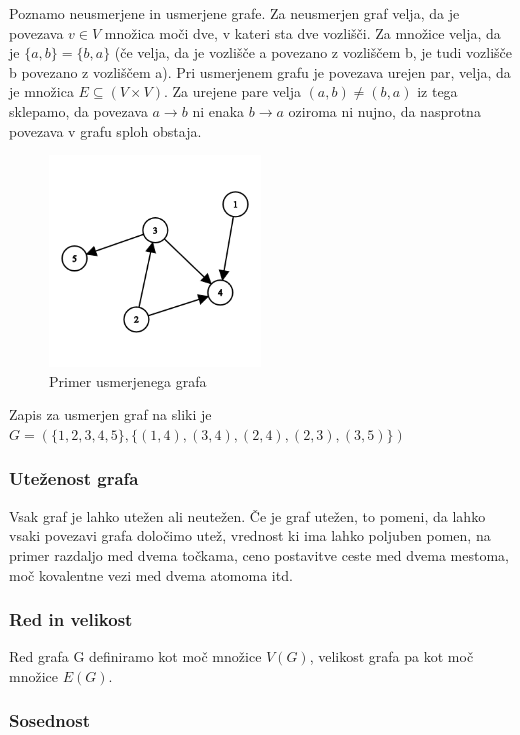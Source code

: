 \documentclass[11pt]{article}
\begin{document}
Poznamo neusmerjene in usmerjene grafe. Za neusmerjen graf velja, da je povezava $v \in V$ množica moči dve, v kateri sta dve vozlišči. Za množice velja, da je $\{a, b\} = \{b, a\}$ (če velja, da je vozlišče a povezano z vozliščem b, je tudi vozlišče b povezano z vozliščem a). Pri usmerjenem grafu je povezava urejen par, velja, da je množica $E \subseteq (V \times V)$. Za urejene pare velja $(a, b) \neq (b, a)$ iz tega sklepamo, da povezava $a \rightarrow b$ ni enaka $b \rightarrow a$ oziroma ni nujno, da nasprotna povezava v grafu sploh obstaja.

\begin{figure}[H]
    \centering
    \includegraphics[width=0.5\textwidth]{directed_graph.png}
    \caption{Primer usmerjenega grafa}
    \label{fig:mesh1}
\end{figure}

Zapis za usmerjen graf na sliki je $G = (\{1, 2, 3, 4, 5\}, \{(1, 4), (3, 4), (2, 4), (2, 3), (3, 5) \})$

\subsubsection{Uteženost grafa}

Vsak graf je lahko utežen ali neutežen. Če je graf utežen, to pomeni, da lahko vsaki povezavi grafa določimo utež, vrednost ki ima lahko poljuben pomen, na primer razdaljo med dvema točkama, ceno postavitve ceste med dvema mestoma, moč kovalentne vezi med dvema atomoma itd. 

\subsubsection{Red in velikost}

Red grafa G definiramo kot moč množice $V(G)$, velikost grafa pa kot moč množice $E(G)$.

\subsubsection{Sosednost}
\end{document}

